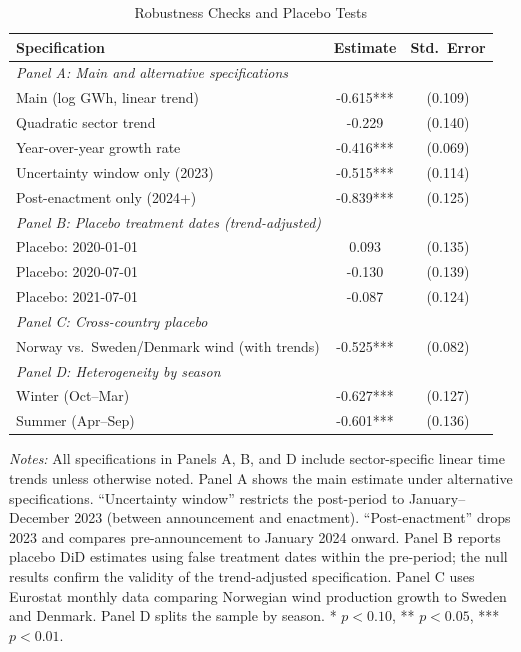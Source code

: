 \begin{table}[H]
\centering
\caption{Robustness Checks and Placebo Tests}
\label{tab:robustness}
\begin{threeparttable}
\begin{tabular}{lcc}
\toprule
Specification & Estimate & Std.\ Error \\
\midrule
\multicolumn{3}{l}{\textit{Panel A: Main and alternative specifications}} \\
Main (log GWh, linear trend) & -0.615*** & (0.109) \\
Quadratic sector trend & -0.229 & (0.140) \\
Year-over-year growth rate & -0.416*** & (0.069) \\
Uncertainty window only (2023) & -0.515*** & (0.114) \\
Post-enactment only (2024+) & -0.839*** & (0.125) \\
\midrule
\multicolumn{3}{l}{\textit{Panel B: Placebo treatment dates (trend-adjusted)}} \\
Placebo: 2020-01-01 & 0.093 & (0.135) \\
Placebo: 2020-07-01 & -0.130 & (0.139) \\
Placebo: 2021-07-01 & -0.087 & (0.124) \\
\midrule
\multicolumn{3}{l}{\textit{Panel C: Cross-country placebo}} \\
Norway vs.\ Sweden/Denmark wind (with trends) & -0.525*** & (0.082) \\
\midrule
\multicolumn{3}{l}{\textit{Panel D: Heterogeneity by season}} \\
Winter (Oct--Mar) & -0.627*** & (0.127) \\
Summer (Apr--Sep) & -0.601*** & (0.136) \\
\bottomrule
\end{tabular}
\begin{tablenotes}[flushleft]
\small
\item \textit{Notes:} All specifications in Panels A, B, and D include sector-specific linear time trends unless otherwise noted. Panel A shows the main estimate under alternative specifications. ``Uncertainty window'' restricts the post-period to January--December 2023 (between announcement and enactment). ``Post-enactment'' drops 2023 and compares pre-announcement to January 2024 onward. Panel B reports placebo DiD estimates using false treatment dates within the pre-period; the null results confirm the validity of the trend-adjusted specification. Panel C uses Eurostat monthly data comparing Norwegian wind production growth to Sweden and Denmark. Panel D splits the sample by season. * $p<0.10$, ** $p<0.05$, *** $p<0.01$.
\end{tablenotes}
\end{threeparttable}
\end{table}

